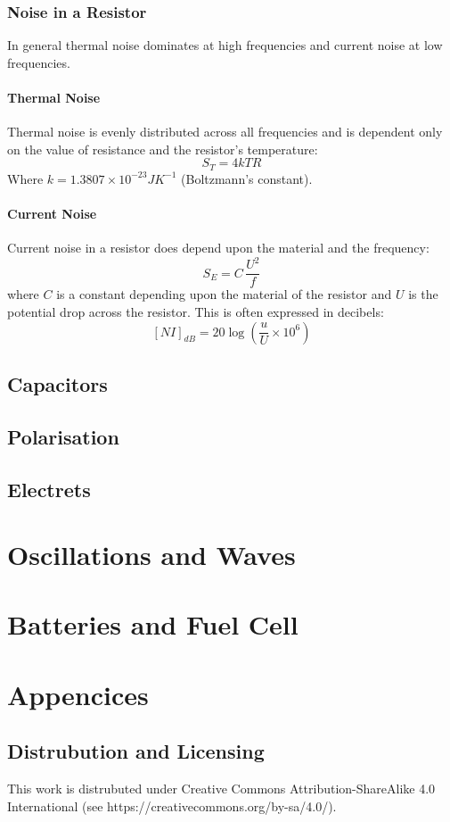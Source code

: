 \documentclass[11pt,a4paper]{report}
\begin{document}
\subsection{Noise in a Resistor}
In general thermal noise dominates at high frequencies and current noise at low frequencies.
\subsubsection{Thermal Noise}
Thermal noise is evenly distributed across all frequencies and is dependent only on the value of resistance and the resistor's temperature:
\[S_T = 4kTR\]
Where $k = 1.3807 \times 10^{-23} JK^{-1}$ (Boltzmann's constant). 

\subsubsection{Current Noise}
Current noise in a resistor does depend upon the material and the frequency:
\[S_E = C \, \frac{U^2}{f}\] where $C$ is a constant depending upon the material of the resistor and $U$ is the potential drop across the resistor.
This is often expressed in decibels:
\[[NI]_{dB} = 20 \log \left( \frac{u}{U} \times 10^6 \right)\]

\section{Capacitors}

\section{Polarisation}

\section{Electrets}

\chapter{Oscillations and Waves}

\chapter{Batteries and Fuel Cell}

\chapter{Appencices}
\section{Distrubution and Licensing}
This work is distrubuted under Creative Commons Attribution-ShareAlike 4.0
International (see https://creativecommons.org/by-sa/4.0/).
\end{document}
